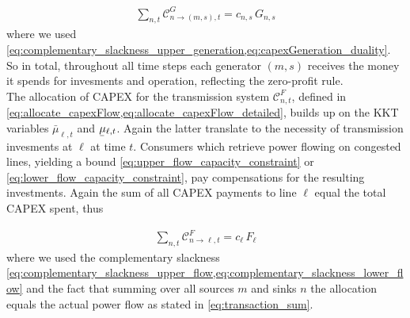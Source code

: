 \documentclass[11pt,twocolumn]{article}
\newcommand{\ubar}[1]{\underaccent{\bar}{#1}}
\newcommand{\note}[1]{\textcolor{Orange}{#1}}
\newcommand{\generation}[1][n]{g_{#1,s,t}}
\newcommand{\capacityGeneration}{G_{n,s}}
\newcommand{\capacityFlow}{F_{\ell}}
\newcommand{\capexGeneration}{c_{n,s}}
\newcommand{\capexFlow}{c_{\ell}}
\newcommand{\opexGeneration}[1][n]{o_{#1,s}}
\newcommand{\demand}[1][n]{d_{#1,a,t}}
\newcommand{\incidence}[1][n]{K_{#1,\ell}}
\newcommand{\mulowergeneration}[1][n]{\ubar{\mu}_{#1,s,t}}
\newcommand{\muuppergeneration}[1][n]{\bar{\mu}_{#1,s,t}}
\newcommand{\mulowerflow}{\ubar{\mu}_{\ell,t}}
\newcommand{\muupperflow}{\bar{\mu}_{\ell,t}}
\newcommand{\lmp}[1][n]{\lambda_{#1,t}}
\newcommand{\flow}{f_{\ell,t}}
\newcommand{\allocateCapexGeneration}[1][n]{\mathcal{C}^{G}_{#1,t}}
\newcommand{\allocateCapexFlow}[1][n]{\mathcal{C}^{F}_{#1,t}}
\newcommand{\Forall}[1]{\hspace{10pt} \forall \,\, #1 }
\begin{document}
\begin{align}
 \sum_{n,t} \allocateCapexGeneration[n \rightarrow (m,s)] = \capexGeneration \, \capacityGeneration
\label{eq:no_profit_capex_generation}
\end{align}
where we used \cref{eq:complementary_slackness_upper_generation,eq:capexGeneration_duality}. So in total, throughout all time steps each generator $(m,s)$ receives the money it spends for invesments and operation, reflecting the zero-profit rule. 
\\ 

The allocation of CAPEX for the transmission system $\allocateCapexFlow$, defined in \cref{eq:allocate_capexFlow,eq:allocate_capexFlow_detailed}, builds up on the KKT variables $\muupperflow$ and $\mulowerflow$. Again the latter translate to the necessity of transmission invesments at $\ell$ at time $t$. Consumers which retrieve power flowing on congested lines, yielding a bound \cref{eq:upper_flow_capacity_constraint} or \eqref{eq:lower_flow_capacity_constraint}, pay compensations for the resulting investments. Again the sum of all CAPEX payments to line $\ell$ equal the total CAPEX spent, thus

\begin{align}
 \sum_{n,t} \allocateCapexFlow[n \rightarrow \ell] = \capexFlow \, \capacityFlow  
\end{align}
where we used the complementary slackness \cref{eq:complementary_slackness_upper_flow,eq:complementary_slackness_lower_flow} and the fact that summing over all sources $m$ and sinks $n$ the allocation equals the actual power flow as stated in \cref{eq:transaction_sum}. 
\end{document}
